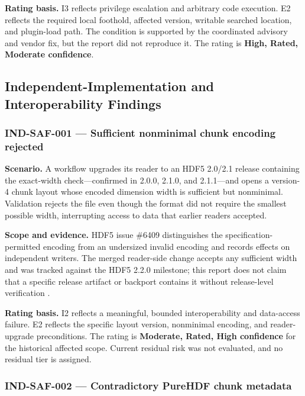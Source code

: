 \documentclass[../main.tex]{subfiles}
\begin{document}
\noindent\textbf{Rating basis.}
I3 reflects privilege escalation and arbitrary code execution. E2 reflects the
required local foothold, affected version, writable searched location, and
plugin-load path. The condition is supported by the coordinated advisory and
vendor fix, but the report did not reproduce it. The rating is
\textbf{High, Rated, Moderate confidence}.

\subsection{Independent-Implementation and Interoperability Findings}

\subsubsection*{IND-SAF-001 --- Sufficient nonminimal chunk encoding rejected}

\noindent\textbf{Scenario.}
A workflow upgrades its reader to an HDF5 2.0/2.1 release containing the
exact-width check---confirmed in 2.0.0, 2.1.0, and 2.1.1---and opens a
version-4 chunk layout whose encoded dimension width is sufficient but
nonminimal. Validation rejects the file even though the format did not require
the smallest possible width, interrupting access to data that earlier readers
accepted.

\noindent\textbf{Scope and evidence.}
HDF5 issue \#6409 distinguishes the specification-permitted encoding from an
undersized invalid encoding and records effects on independent writers. The
merged reader-side change accepts any sufficient width and was tracked against
the HDF5 2.2.0 milestone; this report does not claim that a specific release
artifact or backport contains it without release-level verification
\cite{hdf5-gh-issue-6409,hdf5-gh-pr-6432,purehdf-gh-issue-168,purehdf-pr-160}.

\noindent\textbf{Rating basis.}
I2 reflects a meaningful, bounded interoperability and data-access failure. E2
reflects the specific layout version, nonminimal encoding, and reader-upgrade
preconditions. The rating is \textbf{Moderate, Rated, High confidence} for the
historical affected scope. Current residual risk was not evaluated, and no
residual tier is assigned.

\subsubsection*{IND-SAF-002 --- Contradictory PureHDF chunk metadata}
\end{document}
